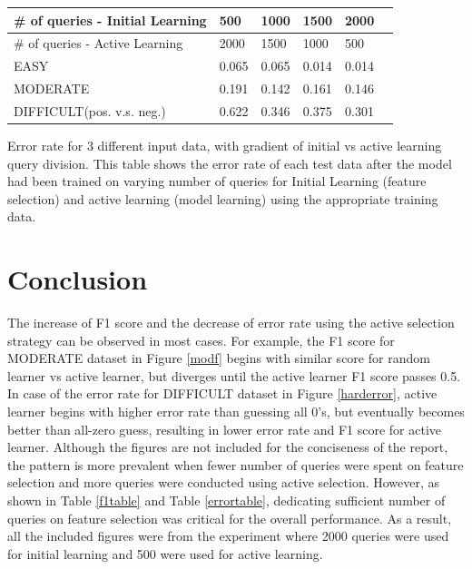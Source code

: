 \documentclass[paper=a4, fontsize=11pt]{scrartcl}
\numberwithin{equation}{section}    %
\numberwithin{figure}{section}      %
\numberwithin{table}{section}       %
\numberwithin{equation}{section}    %
\numberwithin{figure}{section}      %
\numberwithin{table}{section}       %
\begin{document}
\begin{minipage}{\linewidth}
\smallskip
\centering
{} \label{errortable} 
\begin{tabular}{ p{2in} C{.85in} *4{C{.7in}}}\toprule[1.5pt]
\# of queries - Initial Learning & 500 & 1000 & 1500 & 2000  \\ \toprule[1.5pt]
\# of queries - Active Learning & 2000 & 1500 & 1000 & 500  \\ \bottomrule[1.25pt]
EASY                          & 0.065                              & 0.065                               & 0.014                               & 0.014                               \\
MODERATE                      & 0.191                              & 0.142                               & 0.161                               & 0.146                               \\
DIFFICULT(pos. v.s. neg.)     & 0.622                              & 0.346                               & 0.375                               & 0.301                               \\
\bottomrule[1.25pt]
\end{tabular} \par \bigskip 
Error rate for 3 different input data, with gradient of initial vs active learning query division.
This table shows the error rate of each test data after the model had been trained on varying number of queries for Initial Learning (feature selection) and active learning (model learning) using the appropriate training data. 
\end{minipage}
\FloatBarrier


\section{Conclusion}


The increase of F1 score and the decrease of error rate using the active selection strategy can be observed in most cases. For example, the F1 score for MODERATE dataset in Figure \ref{modf} begins with similar score for random learner vs active learner, but diverges until the active learner F1 score passes 0.5. In case of the error rate for DIFFICULT dataset in Figure \ref{harderror}, active learner begins with higher error rate than guessing all 0's, but eventually becomes better than all-zero guess, resulting in lower error rate and F1 score for active learner.  Although the figures are not included for the conciseness of the report, the pattern is more prevalent when fewer number of queries were spent on feature selection and more queries were conducted using active selection. However, as shown in Table \ref{f1table} and Table \ref{errortable}, dedicating sufficient number of queries on feature selection was critical for the overall performance. As a result, all the included figures were from the experiment where 2000 queries were used for initial learning and 500 were used for active learning. 
\end{document}
